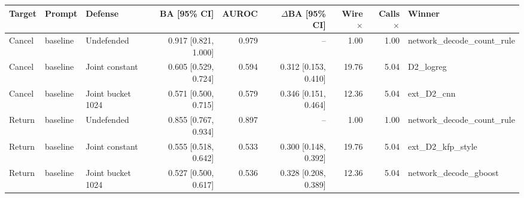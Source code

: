 \begin{tabular}{lllrrrrrl}
\toprule
Target & Prompt & Defense & BA [95\% CI] & AUROC & $\Delta$BA [95\% CI] & Wire $\times$ & Calls $\times$ & Winner \\
\midrule
Cancel & baseline & Undefended & 0.917 [0.821, 1.000] & 0.979 & -- & 1.00 & 1.00 & network\_decode\_count\_rule \\
Cancel & baseline & Joint constant & 0.605 [0.529, 0.724] & 0.594 & 0.312 [0.153, 0.410] & 19.76 & 5.04 & D2\_logreg \\
Cancel & baseline & Joint bucket 1024 & 0.571 [0.500, 0.715] & 0.579 & 0.346 [0.151, 0.464] & 12.36 & 5.04 & ext\_D2\_cnn \\
Return & baseline & Undefended & 0.855 [0.767, 0.934] & 0.897 & -- & 1.00 & 1.00 & network\_decode\_count\_rule \\
Return & baseline & Joint constant & 0.555 [0.518, 0.642] & 0.533 & 0.300 [0.148, 0.392] & 19.76 & 5.04 & ext\_D2\_kfp\_style \\
Return & baseline & Joint bucket 1024 & 0.527 [0.500, 0.617] & 0.536 & 0.328 [0.208, 0.389] & 12.36 & 5.04 & network\_decode\_gboost \\
\bottomrule
\end{tabular}
